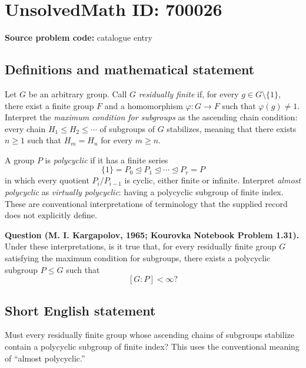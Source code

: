 \documentclass[11pt]{article}
\begin{document}
\section*{UnsolvedMath ID: 700026}
\textbf{Source problem code:} catalogue entry
\subsection{Definitions and mathematical statement}
Let \(G\) be an arbitrary group. Call \(G\) \emph{residually finite} if, for every \(g\in G\setminus\{1\}\), there exist a finite group \(F\) and a homomorphism \(\varphi:G\to F\) such that \(\varphi(g)\ne 1\). Interpret the \emph{maximum condition for subgroups} as the ascending chain condition: every chain \(H_1\le H_2\le\cdots\) of subgroups of \(G\) stabilizes, meaning that there exists \(n\ge 1\) such that \(H_m=H_n\) for every \(m\ge n\).

A group \(P\) is \emph{polycyclic} if it has a finite series
\[
\{1\}=P_0\trianglelefteq P_1\trianglelefteq\cdots\trianglelefteq P_r=P
\]
in which every quotient \(P_i/P_{i-1}\) is cyclic, either finite or infinite. Interpret \emph{almost polycyclic} as \emph{virtually polycyclic}: having a polycyclic subgroup of finite index. These are conventional interpretations of terminology that the supplied record does not explicitly define.

\textbf{Question (M. I. Kargapolov, 1965; Kourovka Notebook Problem 1.31).} Under these interpretations, is it true that, for every residually finite group \(G\) satisfying the maximum condition for subgroups, there exists a polycyclic subgroup \(P\le G\) such that
\[
[G:P]<\infty?
\]
\subsection{Short English statement}
Must every residually finite group whose ascending chains of subgroups stabilize contain a polycyclic subgroup of finite index? This uses the conventional meaning of ``almost polycyclic.''
\end{document}

